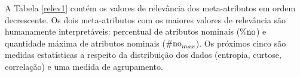 A Tabela \ref{relev1} contém os valores de relevância dos meta-atributos em ordem decrescente.
Os dois meta-atributos com os maiores valores de relevância são humanamente interpretáveis: percentual de atributos nominais ($\operatorname*{\%no}$) e quantidade máxima de atributos nominais ($\operatorname*{\#no}_{max}$).
Os próximos cinco são medidas estatísticas a respeito da distribuição dos dados (entropia, curtose, correlação) e uma medida de agrupamento.
\begin{table}
\caption[Relevância dos meta-atributos]{Relevância dos meta-atributos na recomendação de algoritmos de aprendizado. \textit{Obtida para a primeira metade das consultas de HTUeuc com o meta-aprendiz RFw.}}
\label{relev1}
\parbox[t][]{.28\linewidth}{\vspace{0pt}
\centering
{}
}
\hfill
\parbox[t][]{.3\linewidth}{\vspace{0pt}
\centering
{}}
\end{table}
